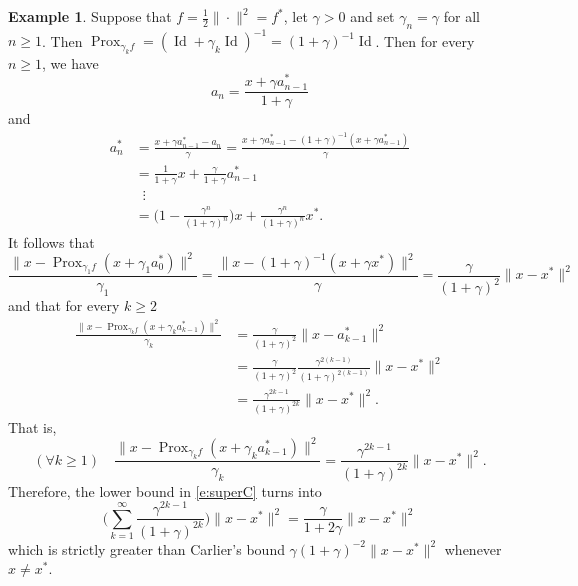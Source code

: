 \documentclass[12pt]{article}
\newcommand{\prox}{\ensuremath{\operatorname{Prox}}}
\newcommand{\Id}{\ensuremath{\operatorname{Id}}}
\theoremstyle{definition}
\newtheorem{example}[theorem]{Example}
\providecommand{\Id}{\operatorname{{ Id}}}
\providecommand{\Id}{\operatorname{Id}}
\begin{document}
{\begin{example}
Suppose that $f=\tfrac{1}{2}\|\cdot\|^2 = f^*$, let 
$\gamma>0$ and set $\gamma_n=\gamma$ for all $n\geq 1$. 
Then 
$\prox_{\gamma_kf}= (\Id+\gamma_k\Id)^{-1}=(1+\gamma)^{-1}\Id$. 
Then for every $n\geq 1$, we have
\begin{equation}
a_n =  \frac{x+\gamma a_{n-1}^*}{1+\gamma} 
\end{equation}
and 
\begin{subequations}
\begin{align}
a_n^* 
&= \frac{x+\gamma a_{n-1}^*-a_n }{\gamma} 
= \frac{x+\gamma a_{n-1}^*-(1+\gamma)^{-1}(x+\gamma a_{n-1}^*)}{\gamma}\\
&= \frac{1}{1+\gamma}x + \frac{\gamma}{1+\gamma}a_{n-1}^*\\
&\;\; \vdots\\
&=\bigg(1-\frac{\gamma^n}{(1+\gamma)^n}\bigg)x + \frac{\gamma^n}{(1+\gamma)^n}x^*. 
\end{align}
\end{subequations}
It follows that 
\begin{equation}
\frac{\|x-\prox_{\gamma_1f}(x+\gamma_1a_{0}^*)\|^2}{\gamma_1}
= \frac{\|x-(1+\gamma)^{-1}(x+\gamma x^*)\|^2}{\gamma}
= \frac{\gamma}{(1+\gamma)^2}\|x-x^*\|^2 
\end{equation}
and that for every $k\geq 2$
\begin{subequations}
\begin{align}
\frac{\|x-\prox_{\gamma_kf}(x+\gamma_ka_{k-1}^*)\|^2}{\gamma_k}
&=\frac{\gamma}{(1+\gamma)^2}\|x-a_{k-1}^*\|^2\\
&=\frac{\gamma}{(1+\gamma)^2}\frac{\gamma^{2(k-1)}}{(1+\gamma)^{2(k-1)}}\|x-x^*\|^2\\
&=\frac{\gamma^{2k-1}}{(1+\gamma)^{2k}}\|x-x^*\|^2. 
\end{align}
\end{subequations}
That is, 
\begin{equation}
(\forall k\geq 1)\quad
\frac{\|x-\prox_{\gamma_kf}(x+\gamma_ka_{k-1}^*)\|^2}{\gamma_k} = \frac{\gamma^{2k-1}}{(1+\gamma)^{2k}}\|x-x^*\|^2. 
\end{equation}
Therefore, the lower bound in \cref{e:superC} turns into 
\begin{equation}
\bigg(\sum_{k=1}^\infty \frac{\gamma^{2k-1}}{(1+\gamma)^{2k}} \bigg)
\|x-x^*\|^2 
= \frac{\gamma}{1+2\gamma}\|x-x^*\|^2
\end{equation}
which is strictly greater than Carlier's bound $\gamma(1+\gamma)^{-2}\|x-x^*\|^2$ 
whenever $x\neq x^*$. 
\end{example}













}
\end{document}
